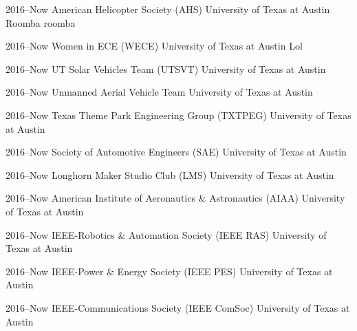 \documentclass[]{friggeri-cv} %
\begin{document}
\begin{entrylist}

	\entry
	{2016--Now}
	{American Helicopter Society (AHS)}
	{University of Texas at Austin}
	{Roomba roomba}


	\entry
	{2016--Now}
	{Women in ECE (WECE)}
	{University of Texas at Austin}
	{Lol}


	\entry
	{2016--Now}
	{UT Solar Vehicles Team (UTSVT)}
	{University of Texas at Austin}
	{}


	\entry
	{2016--Now}
	{Unmanned Aerial Vehicle Team}
	{University of Texas at Austin}
	{}


	\entry
	{2016--Now}
	{Texas Theme Park Engineering Group (TXTPEG)}
	{University of Texas at Austin}
	{}


	\entry
	{2016--Now}
	{Society of Automotive Engineers (SAE)}
	{University of Texas at Austin}
	{}


	\entry
	{2016--Now}
	{Longhorn Maker Studio Club (LMS)}
	{University of Texas at Austin}
	{}


	\entry
	{2016--Now}
	{American Institute of Aeronautics \& Astronautics (AIAA)}
	{University of Texas at Austin}
	{}


	\entry
	{2016--Now}
	{IEEE-Robotics \& Automation Society (IEEE RAS)}
	{University of Texas at Austin}
	{}


	\entry
	{2016--Now}
	{IEEE-Power \& Energy Society (IEEE PES)}
	{University of Texas at Austin}
	{}


	\entry
	{2016--Now}
	{IEEE-Communications Society (IEEE ComSoc)}
	{University of Texas at Austin}
	{}



\end{entrylist}
\end{document}
